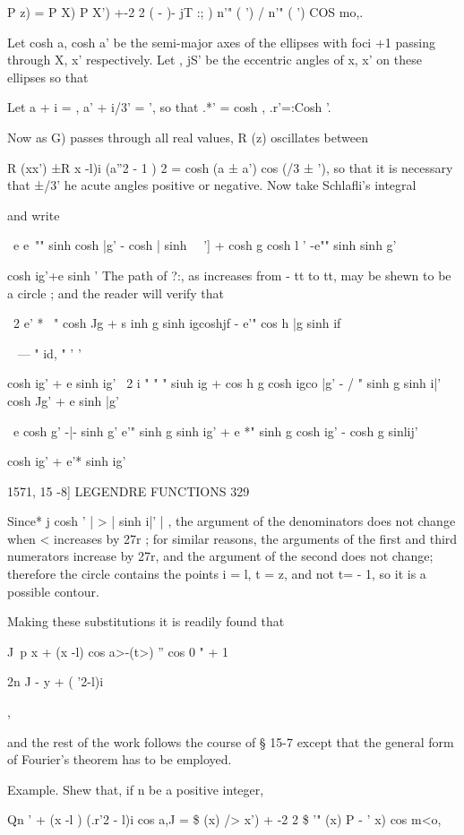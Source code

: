 {{{P z) = P X) P X') +-2 2 ( - )- jT :; ) n'" ( ') / n'" ( ') COS mo,.

Let cosh a, cosh a' be the semi-major axes of the ellipses with foci
+1 passing through X, x' respectively. Let , jS' be the eccentric
angles of x, x' on these ellipses so that

Let a + i = , a' + i/3' = ', so that .*' = cosh , .r'=:Cosh '.

Now as G) passes through all real values, R (z) oscillates between

R (xx') ±R x -l)i (a''2 - 1 ) 2 = cosh (a ± a') cos (/3 ± '), so that
it is necessary that ±/3' he acute angles positive or negative. Now
take Schlafli's integral

and write

\ e e~"" sinh cosh |g' - cosh | sinh \ \ '] + cosh g cosh l ' -e""
sinh sinh g'

cosh ig'+e sinh ' The path of ?:, as increases from - tt to tt, may be
shewn to be a circle ; and the reader will verify that

\ 2 e' * ~" cosh Jg + s inh g sinh igcoshjf - e'" cos h |g sinh if

 ~ — " id, " ' '

cosh ig' + e sinh ig' \ 2 i " " " siuh ig + cos h g cosh igco |g' - /
" sinh g sinh i|' cosh Jg' + e sinh |g'

\ e cosh g' -|- sinh g' e'" sinh g sinh ig' + e *" sinh g cosh ig' -
cosh g sinlij'

cosh ig' + e'* sinh ig'

1571, 15 -8] LEGENDRE FUNCTIONS 329

Since* j cosh ' | > | sinh i|' | , the argument of the denominators
does not change when < increases by 27r ; for similar reasons, the
arguments of the first and third numerators increase by 27r, and the
argument of the second does not change; therefore the circle contains
the points i = l, t = z, and not t= - 1, so it is a possible contour.

Making these substitutions it is readily found that

J\ p x + (x -l) cos a>-(t>) '' cos 0 " + 1

2n J - y + ( '2-l)i

 ,

and the rest of the work follows the course of § 15-7 except that the
general form of Fourier's theorem has to be employed.

Example. Shew that, if n be a positive integer,

Qn ' + (x -l ) (.r'2 - l)i cos a,J = \$ (x) /> x') + -2 2 \$ '" (x) P
- ' x) cos m<o,

}}}
